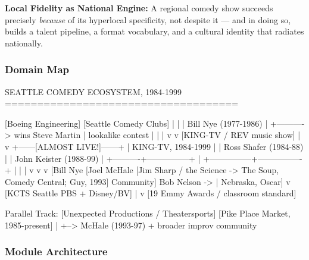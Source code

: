 \documentclass[11pt,letterpaper]{article}
\begin{document}
\textbf{Local Fidelity as National Engine:} A regional comedy show succeeds precisely \textit{because} of its hyperlocal specificity, not despite it --- and in doing so, builds a talent pipeline, a format vocabulary, and a cultural identity that radiates nationally.

\subsubsection{Domain Map}

\begin{asciibox}
SEATTLE COMEDY ECOSYSTEM, 1984-1999
====================================

  [Boeing Engineering]          [Seattle Comedy Clubs]
       |                               |
       |     Bill Nye (1977-1986)      |
       +----------> wins Steve Martin  |
                    lookalike contest  |
                         |             |
                         v             v
                    [KING-TV / REV music show]
                              |
                              v
               +------[ALMOST LIVE!]------+
               |    KING-TV, 1984-1999    |
               |  Ross Shafer (1984-88)   |
               |  John Keister (1988-99)  |
               +----------+---------------+
                          |
          +---------------+----------------+
          |               |                |
          v               v                v
  [Bill Nye          [Joel McHale    [Jim Sharp /
  the Science        -> The Soup,    Comedy Central;
  Guy, 1993]         Community]     Bob Nelson ->
     |                              Nebraska, Oscar]
     v
  [KCTS Seattle PBS + Disney/BV]
     |
     v
  [19 Emmy Awards / classroom standard]

  Parallel Track:
  [Unexpected Productions / Theatersports]
  [Pike Place Market, 1985-present]
         |
         +--> McHale (1993-97) + broader improv community
\end{asciibox}

\subsubsection{Module Architecture}
\end{document}
